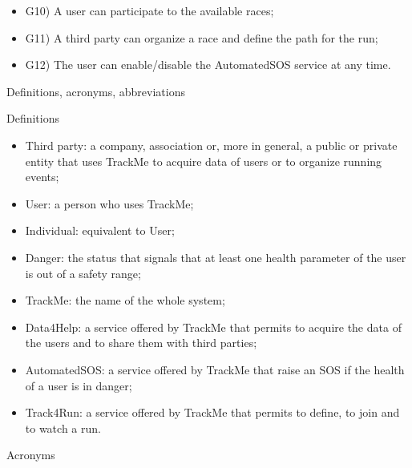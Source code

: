 \documentclass{article}
\begin{document}
\begin{legal}
\begin{legal}
\begin{legal}
{\begin{itemize}
				\item G10) A user can participate to the available races;\\
				\item G11) A third party can organize a race and define the path for the run;\\
				\item G12) The user can enable/disable the AutomatedSOS service at any time.\\
				\end{itemize}
			}
			\end{legal}
		\item Definitions, acronyms, abbreviations\\
			\begin{legal}
			\item Definitions\\
			{\normalfont
				\begin{itemize}
				\item Third party: a company, association or, more in general, a public or private entity that uses TrackMe to acquire data of users or to organize running events;\\
				\item User: a person who uses TrackMe;\\
				\item Individual: equivalent to User;\\
				\item Danger: the status that signals that at least one health parameter of the user is out of a safety range;\\
				\item TrackMe: the name of the whole system;\\
				\item Data4Help: a service offered by TrackMe that permits to acquire the data of the users and to share them with third parties;\\
				\item AutomatedSOS: a service offered by TrackMe that raise an SOS if the health of a user is in danger;\\
				\item Track4Run: a service offered by TrackMe that permits to define, to join and to watch a run.\\
				\end{itemize}
			}	
			\item Acronyms\\
			{\normalfont	
				\begin{itemize}

\end{itemize}}
\end{legal}
\end{legal}
\end{legal}
\end{document}
